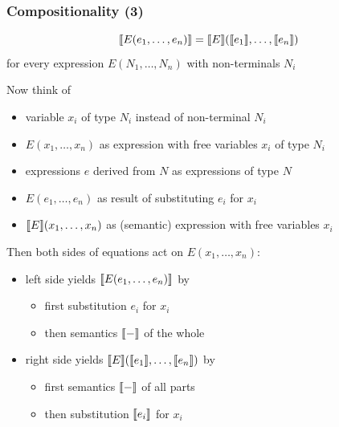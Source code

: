 \documentclass{beamer}
\begin{document}
\begin{frame}\frametitle{Compositionality (3)}
\[\llbracket E(e_1,\ldots,e_n)\rrbracket=\llbracket E\rrbracket(\llbracket e_1\rrbracket,\ldots,\llbracket e_n\rrbracket)\]
for every expression $E(N_1,\ldots,N_n)$ with non-terminals $N_i$
\bigskip

Now think of
\begin{itemize}
\item variable $x_i$ of type $N_i$ instead of non-terminal $N_i$
\item $E(x_1,\ldots,x_n)$ as expression with free variables $x_i$ of type $N_i$
\item expressions $e$ derived from $N$ as expressions of type $N$
\item $E(e_1,\ldots,e_n)$ as result of substituting $e_i$ for $x_i$
\item $\llbracket E\rrbracket(x_1,\ldots,x_n)$ as (semantic) expression with free variables $x_i$
\end{itemize}

Then both sides of equations act on $E(x_1,\ldots,x_n)$:
\begin{itemize}
\item left side yields $\llbracket E(e_1,\ldots,e_n)\rrbracket$ by
\begin{itemize}
\item first substitution $e_i$ for $x_i$
\item then semantics $\llbracket -\rrbracket$ of the whole
\end{itemize}
\item right side yields $\llbracket E\rrbracket(\llbracket e_1\rrbracket,\ldots,\llbracket e_n\rrbracket)$ by
\begin{itemize}
\item first semantics $\llbracket -\rrbracket$ of all parts
\item then substitution $\llbracket e_i\rrbracket$ for $x_i$
\end{itemize}
\end{itemize}
\end{frame}
\end{document}
